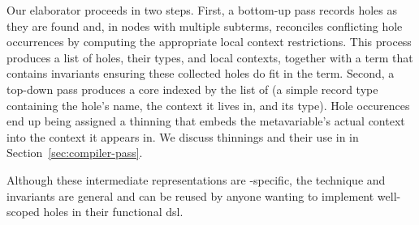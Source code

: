 Our elaborator proceeds in two steps.
%
First, a bottom-up pass records holes as they are found and, in nodes with multiple subterms, reconciles conflicting hole occurrences by computing the appropriate local context restrictions.
%
This process produces a list of holes, their types, and local contexts,
together with a  term that contains invariants ensuring
these collected holes do fit in the term.
%
Second, a top-down pass produces a core  indexed by the list of  (a simple record type containing the hole's name, the context it lives in, and its type).
%
Hole occurences end up being assigned a thinning that embeds the metavariable's actual context into the context it appears in.
We discuss thinnings and their use in \Velo{} in Section~\ref{sec:compiler-pass}.

Although these intermediate representations are \Velo{}-specific, the technique
and invariants are general and can be reused by anyone wanting to implement
well-scoped holes in their functional \ac{dsl}.

